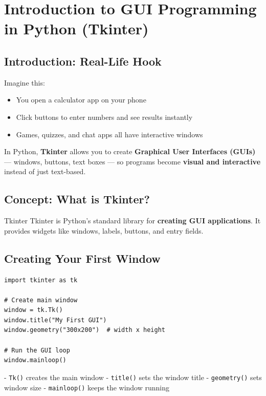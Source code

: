 \chapter{Introduction to GUI Programming in Python (Tkinter)}

\section{Introduction: Real-Life Hook}

Imagine this:  

\begin{itemize}
    \item You open a calculator app on your phone  
    \item Click buttons to enter numbers and see results instantly  
    \item Games, quizzes, and chat apps all have interactive windows  
\end{itemize}

In Python, \textbf{Tkinter} allows you to create \textbf{Graphical User Interfaces (GUIs)} --- windows, buttons, text boxes --- so programs become \textbf{visual and interactive} instead of just text-based.

\section{Concept: What is Tkinter?}

\begin{definition}{Tkinter}
Tkinter is Python’s standard library for \textbf{creating GUI applications}. It provides widgets like windows, labels, buttons, and entry fields.
\end{definition}

\section{Creating Your First Window}

\begin{verbatim}
import tkinter as tk

# Create main window
window = tk.Tk()
window.title("My First GUI")
window.geometry("300x200")  # width x height

# Run the GUI loop
window.mainloop()
\end{verbatim}

- \texttt{Tk()} creates the main window  
- \texttt{title()} sets the window title  
- \texttt{geometry()} sets window size  
- \texttt{mainloop()} keeps the window running  

